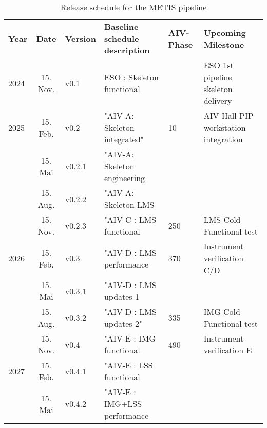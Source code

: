 \documentclass[a4paper]{spie}  %
\begin{document}
\begin{table}[]
\caption{Release schedule for the METIS pipeline}
\label{tab:pip_releases}
\begin{tabular}{lcllll}
{\textbf{Year}} & \textbf{Date} & \textbf{Version} & \textbf{Baseline schedule description} & {\textbf{AIV-Phase}} & \textbf{Upcoming Milestone}          \\
{2024}          & 15. Nov.      & v0.1             & ESO : Skeleton functional      &                                        & ESO 1st pipeline skeleton delivery   \\
{2025}          & 15. Feb.      & v0.2             & "AIV-A: Skeleton integrated"    & 10                 & AIV Hall PIP workstation integration \\
                                  & 15. Mai       & v0.2.1           & "AIV-A: Skeleton engineering  &                                        &                                      \\
                                  & 15. Aug.      & v0.2.2           & "AIV-A: Skeleton LMS           &                                        &                                      \\
                                  & 15. Nov.      & v0.2.3           & "AIV-C : LMS functional       & {250}                & LMS Cold Functional test             \\
{2026}          & 15. Feb.      & v0.3             &"AIV-D : LMS performance       & {370}                & Instrument verification C/D          \\
                                  & 15. Mai       & v0.3.1           & "AIV-D : LMS updates 1         &                                        &                                      \\
                                  & 15. Aug.      & v0.3.2           & "AIV-D : LMS updates 2"        & {335}                & IMG Cold Functional test             \\
                                  & 15. Nov.      & v0.4             &"AIV-E : IMG functional         & {490}                & Instrument verification E            \\
{2027}          & 15. Feb.      & v0.4.1           & "AIV-E : LSS functional      &                                        &                                      \\
                                  & 15. Mai       & v0.4.2           & "AIV-E : IMG+LSS performance   &                                        &                                      \\

\end{tabular}
\end{table}
\end{document}
